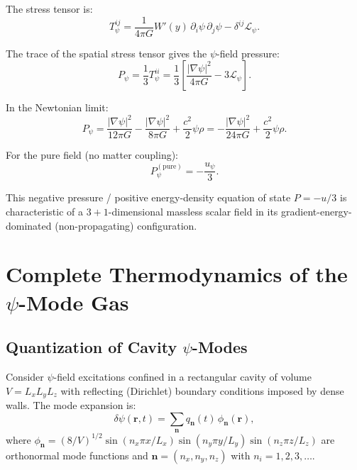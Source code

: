 \documentclass[aps,prd,twocolumn,showpacs,preprintnumbers,superscriptaddress,nofootinbib]{revtex4-2}
\newcommand{\Wfunc}{W}
\begin{document}
The stress tensor is:
\begin{equation}\label{eq:Tij}
T^{ij}_\psi = \frac{1}{4\pi G}\Wfunc'(y)\,\partial_i\psi\,\partial_j\psi
  - \delta^{ij}\mathcal{L}_\psi.
\end{equation}

The trace of the spatial stress tensor gives the $\psi$-field pressure:
\begin{equation}\label{eq:pressure}
P_\psi = \frac{1}{3}T^{ii}_\psi
  = \frac{1}{3}\left[\frac{|\nabla\psi|^2}{4\pi G} - 3\mathcal{L}_\psi\right].
\end{equation}

In the Newtonian limit:
\begin{equation}\label{eq:pressure-newton}
P_\psi = \frac{|\nabla\psi|^2}{12\pi G} - \frac{|\nabla\psi|^2}{8\pi G}
  + \frac{c^2}{2}\psi\rho
  = -\frac{|\nabla\psi|^2}{24\pi G} + \frac{c^2}{2}\psi\rho.
\end{equation}

For the pure field (no matter coupling):
\begin{equation}\label{eq:P-pure}
P_\psi^{(\mathrm{pure})} = -\frac{u_\psi}{3}.
\end{equation}

This negative pressure / positive energy-density equation of state
$P = -u/3$ is characteristic of a $3{+}1$-dimensional massless scalar
field in its gradient-energy-dominated (non-propagating) configuration.

\section{Complete Thermodynamics of the $\psi$-Mode Gas}\label{sec:thermo}

\subsection{Quantization of Cavity $\psi$-Modes}\label{sec:quantize}

Consider $\psi$-field excitations confined in a rectangular cavity of
volume $V = L_x L_y L_z$ with reflecting (Dirichlet) boundary conditions
imposed by dense walls.  The mode expansion is:
\begin{equation}\label{eq:mode-expansion}
\delta\psi(\mathbf{r},t) = \sum_{\mathbf{n}} q_{\mathbf{n}}(t)\,
  \phi_{\mathbf{n}}(\mathbf{r}),
\end{equation}
where $\phi_{\mathbf{n}} = (8/V)^{1/2}\sin(n_x\pi x/L_x)
\sin(n_y\pi y/L_y)\sin(n_z\pi z/L_z)$ are orthonormal mode functions
and $\mathbf{n} = (n_x, n_y, n_z)$ with $n_i = 1,2,3,\ldots$.
\end{document}
